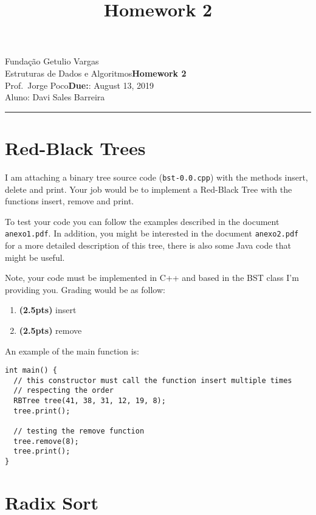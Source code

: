 \documentclass{article}
\title{Homework 2}
\date{}
\newcommand{\assignment}{Homework 2}
\newcommand{\duedate}{August 13, 2019}
\begin{document}
Fundação Getulio Vargas\hfill\\
Estruturas de Dados e Algoritmos\hfill\textbf{\assignment}\\
Prof.\ Jorge Poco\hfill\textbf{Due:}: \duedate\\
Aluno: Davi Sales Barreira
\smallskip\hrule\bigskip

{\let\newpage\relax\maketitle}
\maketitle


\section{Red-Black Trees}

I am attaching a binary tree source code (\texttt{bst-0.0.cpp}) with the methods insert, delete and print. Your job would be to implement a Red-Black Tree with the functions insert, remove and print. 

To test your code you can follow the examples described in the document \texttt{anexo1.pdf}. In addition, you might be interested in the document \texttt{anexo2.pdf} for a more detailed description of this tree, there is also some Java code that might be useful. 

Note, your code must be implemented in C++ and based in the BST class I'm providing you. Grading would be as follow:

\begin{enumerate}[label=(\alph*)]
  \item \textbf{(2.5pts)} insert 
  \item \textbf{(2.5pts)} remove 
\end{enumerate}

An example of the main function is: 

\begin{lstlisting}
int main() {
  // this constructor must call the function insert multiple times 
  // respecting the order
  RBTree tree(41, 38, 31, 12, 19, 8);
  tree.print();

  // testing the remove function
  tree.remove(8);
  tree.print();
}
\end{lstlisting}




\section{Radix Sort}
\end{document}
